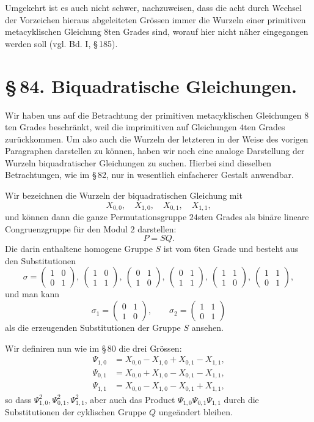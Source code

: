 \documentclass[11pt]{article}
\providecommand{\mat}[4]{\begin{pmatrix}#1&#2\\#3&#4\end{pmatrix}}
\providecommand{\mat}[4]{\begin{pmatrix}#1&#2\\#3&#4\end{pmatrix}}
\providecommand{\mat}[1]{\begin{pmatrix}#1\end{pmatrix}}
\begin{document}
Umgekehrt ist es auch nicht schwer, nachzuweisen, dass die acht durch Wechsel der Vorzeichen hieraus abgeleiteten Grössen immer die Wurzeln einer primitiven metacyklischen Gleichung $8$ten Grades sind, worauf hier nicht näher eingegangen werden soll (vgl. Bd. I, \S\,185).

\section*{\S\,84. Biquadratische Gleichungen.}

Wir haben uns auf die Betrachtung der primitiven metacyklischen Gleichungen $8$ten Grades beschränkt, weil die imprimitiven auf Gleichungen $4$ten Grades zurückkommen. Um also auch die Wurzeln der letzteren in der Weise des vorigen Paragraphen darstellen zu können, haben wir noch eine analoge Darstellung der Wurzeln biquadratischer Gleichungen zu suchen. Hierbei sind dieselben Betrachtungen, wie im \S\,82, nur in wesentlich einfacherer Gestalt anwendbar.

Wir bezeichnen die Wurzeln der biquadratischen Gleichung mit
\begin{equation}
 X_{0,0},\quad X_{1,0},\quad X_{0,1},\quad X_{1,1},
 \tag{1}
\end{equation}
und können dann die ganze Permutationsgruppe $24$sten Grades als binäre lineare Congruenzgruppe für den Modul $2$ darstellen:
\begin{equation}
 P=SQ.
 \tag{2}
\end{equation}
Die darin enthaltene homogene Gruppe $S$ ist vom $6$ten Grade und besteht aus den Substitutionen
\begin{equation}
 \sigma=\mat{1}{0}{0}{1},\ \mat{1}{0}{1}{1},\ \mat{0}{1}{1}{0},\ \mat{0}{1}{1}{1},\ \mat{1}{1}{1}{0},\ \mat{1}{1}{0}{1},
 \tag{3}
\end{equation}
und man kann
\begin{equation}
 \sigma_1=\mat{0}{1}{1}{0},
 \qquad
 \sigma_2=\mat{1}{1}{0}{1}
 \tag{4}
\end{equation}
als die erzeugenden Substitutionen der Gruppe $S$ ansehen.

Wir definiren nun wie im \S\,80 die drei Grössen:
\begin{equation}
\begin{aligned}
 \Psi_{1,0}&=X_{0,0}-X_{1,0}+X_{0,1}-X_{1,1},\\
 \Psi_{0,1}&=X_{0,0}+X_{1,0}-X_{0,1}-X_{1,1},\\
 \Psi_{1,1}&=X_{0,0}-X_{1,0}-X_{0,1}+X_{1,1},
\end{aligned}
\tag{5}
\end{equation}
so dass $\Psi_{1,0}^2,\Psi_{0,1}^2,\Psi_{1,1}^2$, aber auch das Product $\Psi_{1,0}\Psi_{0,1}\Psi_{1,1}$ durch die Substitutionen der cyklischen Gruppe $Q$ ungeändert bleiben.
\end{document}
